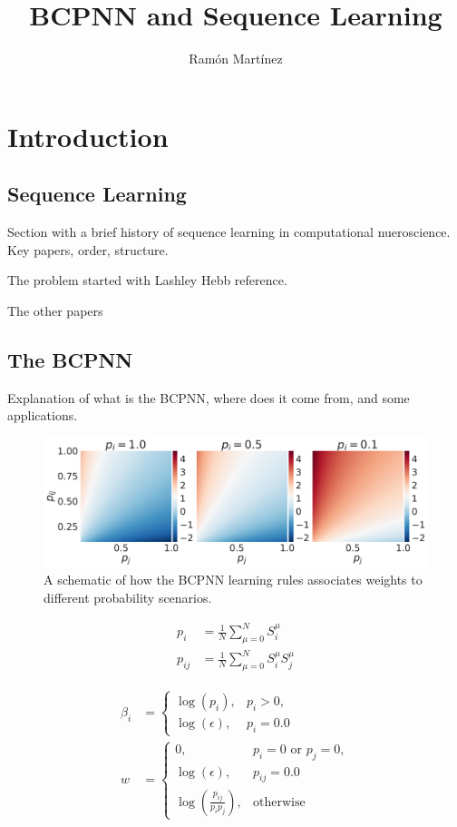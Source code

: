 \documentclass[10pt,a4paper]{article}
\author{Ram\'on Mart\'inez}
\title{BCPNN and Sequence Learning}
\begin{document}
\maketitle

\section{Introduction}

\subsection{Sequence Learning}
Section with a brief history of sequence learning in computational nueroscience. Key papers, order, structure. 


The problem started with Lashley \cite{lashley1951problem} Hebb reference. 

The other papers

\subsection{The BCPNN}
Explanation of what is the BCPNN, where does it come from, and some applications. 

\begin{figure}[H]
\centering
\includegraphics[scale=0.30]{bcpnn_probabiltiies.pdf}
\caption{A schematic of how the BCPNN learning rules associates weights to different probability scenarios.}
\label{fig:bcpnn_probabilities}
\end{figure}

\begin{align}
p_i &= \frac{1}{N}\sum_{\mu=0}^{N} S_i^{\mu} \label{eq:prob_counting} \\  
p_{ij} &= \frac{1}{N} \sum_{\mu=0}^N S_i^{\mu} S_j^{\mu} \label{eq:prob_counting_co}
\end{align}

\begin{align}
\beta_i &=  \begin{cases}
       \log(p_i),&  p_i > 0,\\
       \log(\epsilon),& p_i = 0.0
    \end{cases} \label{eq:bcpnn_beta} \\
w &= \begin{cases}
       0 ,&  p_i=0 \text{ or } p_j = 0,\\
       \log(\epsilon),& p_{ij} = 0.0 \\
       \log(\frac{p_{ij}}{p_i p_j}),&  \text{otherwise}  
    \end{cases} \label{eq:bcpnn_w}
\end{align}
\end{document}
